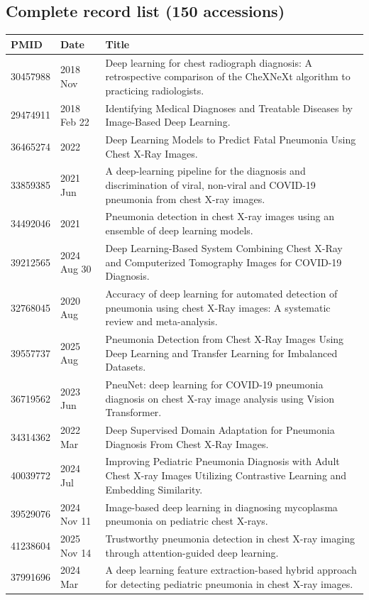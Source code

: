 \subsection*{Complete record list (150 accessions)}
\begin{longtable}{llp{9.5cm}}
\hline
PMID & Date & Title \\
\hline
30457988 & 2018 Nov & Deep learning for chest radiograph diagnosis: A retrospective comparison of the CheXNeXt algorithm to practicing radiologists. \\
29474911 & 2018 Feb 22 & Identifying Medical Diagnoses and Treatable Diseases by Image-Based Deep Learning. \\
36465274 & 2022 & Deep Learning Models to Predict Fatal Pneumonia Using Chest X-Ray Images. \\
33859385 & 2021 Jun & A deep-learning pipeline for the diagnosis and discrimination of viral, non-viral and COVID-19 pneumonia from chest X-ray images. \\
34492046 & 2021 & Pneumonia detection in chest X-ray images using an ensemble of deep learning models. \\
39212565 & 2024 Aug 30 & Deep Learning-Based System Combining Chest X-Ray and Computerized Tomography Images for COVID-19 Diagnosis. \\
32768045 & 2020 Aug & Accuracy of deep learning for automated detection of pneumonia using chest X-Ray images: A systematic review and meta-analysis. \\
39557737 & 2025 Aug & Pneumonia Detection from Chest X-Ray Images Using Deep Learning and Transfer Learning for Imbalanced Datasets. \\
36719562 & 2023 Jun & PneuNet: deep learning for COVID-19 pneumonia diagnosis on chest X-ray image analysis using Vision Transformer. \\
34314362 & 2022 Mar & Deep Supervised Domain Adaptation for Pneumonia Diagnosis From Chest X-Ray Images. \\
40039772 & 2024 Jul & Improving Pediatric Pneumonia Diagnosis with Adult Chest X-ray Images Utilizing Contrastive Learning and Embedding Similarity. \\
39529076 & 2024 Nov 11 & Image-based deep learning in diagnosing mycoplasma pneumonia on pediatric chest X-rays. \\
41238604 & 2025 Nov 14 & Trustworthy pneumonia detection in chest X-ray imaging through attention-guided deep learning. \\
37991696 & 2024 Mar & A deep learning feature extraction-based hybrid approach for detecting pediatric pneumonia in chest X-ray images. \\

\end{longtable}
